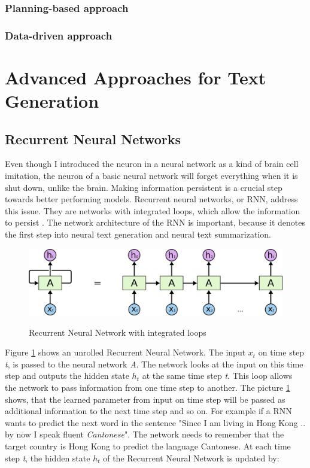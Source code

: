 \subsubsection{Planning-based approach}
\subsubsection{Data-driven approach}




\section{Advanced Approaches for Text Generation}
\subsection{Recurrent Neural Networks}
Even though I introduced the neuron in a neural network as a kind of brain cell imitation, the neuron of a basic neural network will forget everything when it is shut down, unlike the brain. Making information persistent is a crucial step towards better performing models. Recurrent neural networks, or RNN, address this issue. They are networks with integrated loops, which allow the information to persist \cite{olah}. The network architecture of the RNN is important, because it denotes the first step into neural text generation and neural text summarization. 

\begin{figure}
	\begin{center}
		\includegraphics[width=4.5in]{photos/RNN-unrolled}\\
		\caption{Recurrent Neural Network with integrated loops \cite{olah}}\label{rnn}
	\end{center}
\end{figure}

Figure \ref{rnn} shows an unrolled Recurrent Neural Network. The input \(x_t\) on time step \textit{t}, is passed to the neural network \textit{A}. The network looks at the input on this time step and outputs the hidden state \(h_t\) at the same time step \textit{t}. This loop allows the network to pass information from one time step to another. The picture \ref{rnn} shows, that the learned parameter from input  on time step  will be passed as additional information to the next time step  and so on. For example if a RNN wants to predict the next word in the sentence "Since I am living in Hong Kong .. by now I speak fluent \textit{Cantonese}". The network needs to remember that the target country is Hong Kong to predict the language Cantonese. At each time step \textit{t}, the hidden state \textit{\(h_t\)} of the Recurrent Neural Network is updated by:

